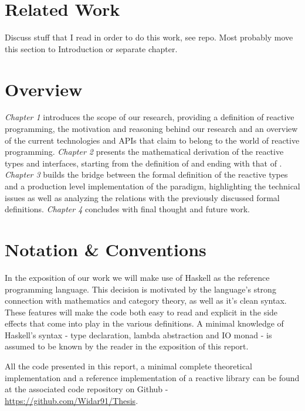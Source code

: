 \section*{Related Work}

Discuss stuff that I read in order to do this work, see repo. Most probably move this section to Introduction or separate chapter.

\section*{Overview}

\textit{Chapter 1} introduces the scope of our research, providing a definition of reactive programming, the motivation and reasoning behind our research and an overview of the current technologies and APIs that claim to belong to the world of reactive programming. \textit{Chapter 2} presents the mathematical derivation of the reactive types and interfaces, starting from the definition of  and ending with that of . \textit{Chapter 3} builds the bridge between the formal definition of the reactive types and a production level implementation of the paradigm, highlighting the technical issues as well as analyzing the relations with the previously discussed formal definitions. \textit{Chapter 4} concludes with final thought and future work.

\section*{Notation \& Conventions}

In the exposition of our work we will make use of Haskell as the reference programming language. This decision is motivated by the language's strong connection with mathematics and category theory, as well as it's clean syntax. These features will make the code both easy to read and explicit in the side effects that come into play in the various definitions. A minimal knowledge of Haskell's syntax - type declaration, lambda abstraction and IO monad - is assumed to be known by the reader in the exposition of this report. 

All the code presented in this report, a minimal complete theoretical implementation and a reference implementation of a reactive library can be found at the associated code repository on Github - \url{https://github.com/Widar91/Thesis}. 

